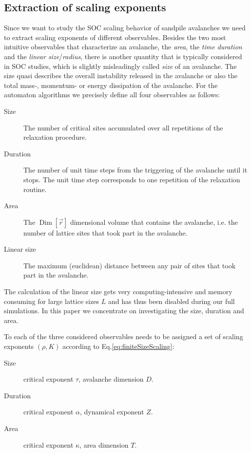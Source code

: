 \subsection{Extraction of scaling exponents}
\label{sec:extractCritExp}
Since we want to study the SOC scaling behavior of sandpile avalanches we need to extract scaling exponents of
different observables. Besides the two most intuitive observables that characterize an avalanche, the \emph{area},
the \emph{time duration} and the \emph{linear size}/\emph{radius}, there is another quantity that is typically considered
in SOC studies, which is slightly misleadingly called \emph{size} of an avalanche. The size quasi describes the overall
instability released in the avalanche or also the total mass-, momentum- or energy dissipation of the avalanche.
For the automaton algorithms we precisely define all four observables as follows:
\begin{description}
\item[Size] The number of critical sites accumulated over all repetitions of the relaxation procedure.
\item[Duration] The number of unit time steps from the triggering of the avalanche until it stops. The unit time step
                corresponds to one repetition of the relaxation routine.
\item[Area] The $\operatorname{Dim}\left[\vec{r}\right]$ dimensional volume that contains the avalanche,
            i.e. the number of lattice sites that took part in the avalanche.
\item[Linear size] The maximum (euclidean) distance between any pair of sites that took part in the avalanche.
\end{description}
The calculation of the linear size gets very computing-intensive and memory consuming for large
lattice sizes $L$ and has thus been disabled during our full simulations. In this paper we concentrate
on investigating the size, duration and area.

To each of the three considered observables needs to be assigned a set of scaling exponents $(\rho,K)$
according to Eq.\eqref{eq:finiteSizeScaling}:
\begin{description}
\item[Size] critical exponent $\tau$, avalanche dimension $D$.
\item[Duration] critical exponent $\alpha$, dynamical exponent $Z$.
\item[Area] critical exponent $\kappa$, area dimension $T$.
\end{description}

